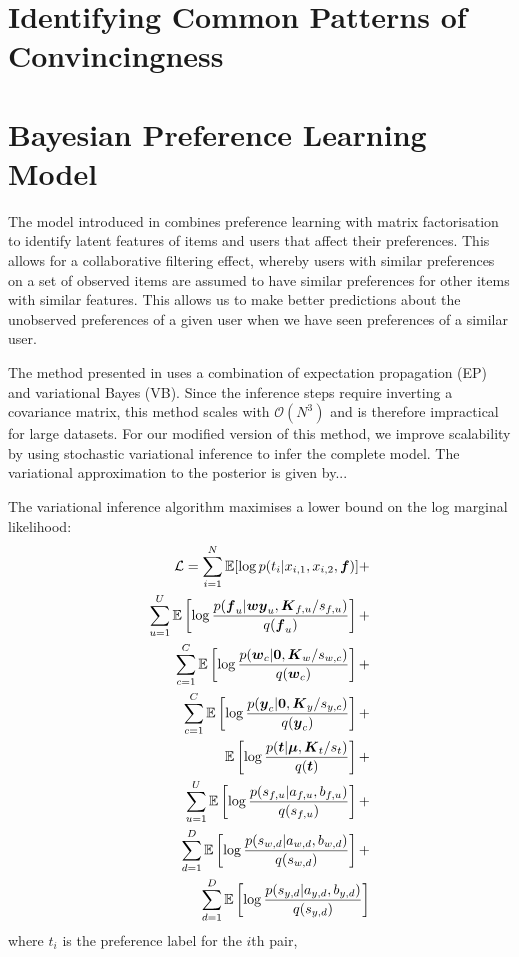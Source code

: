 \section{Identifying Common Patterns of Convincingness}\label{sec:model}

\section{Bayesian Preference Learning Model}

The model introduced in \cite{houlsby2012collaborative} combines preference learning with matrix factorisation 
to identify latent features of items and users that affect their preferences. This allows for a collaborative filtering effect, whereby users with similar preferences on a set of observed items are assumed to have similar 
preferences for other items with similar features. This allows us to make better predictions about the unobserved preferences of a given user when we have seen preferences of a similar user.

The method presented in \cite{houlsby2012collaborative} uses a combination of expectation propagation (EP) and variational Bayes (VB). Since the inference steps require inverting a covariance matrix, this method scales with 
$\mathcal{O}(N^3)$ and is therefore impractical for large datasets. For our modified version of this method, we improve scalability by using stochastic variational inference to infer the complete model. 
The variational approximation to the posterior is given by...

The variational inference algorithm maximises a lower bound on the log marginal likelihood:
\begin{eqnarray}
  \mathcal{L} = \sum_{i=1}^N \mathbb{E}[ \log p(t_i | x_{i,1}, x_{i,2}, \boldsymbol f) ] + \nonumber\\
  \sum_{u=1}^U  \mathbb{E}\left[ \log \frac{p(\boldsymbol f_u | \boldsymbol w \boldsymbol y_u, \boldsymbol K_{f,u} / s_{f,u} )}{q(\boldsymbol f_u)}\right] + \nonumber\\
  \sum_{c=1}^C \mathbb{E}\left[\log\frac{p(\boldsymbol w_c | \boldsymbol 0, \boldsymbol K_w / s_{w,c} ) }{q(\boldsymbol w_c) } \right] + \nonumber\\
  \sum_{c=1}^C \mathbb{E}\left[\log\frac{p(\boldsymbol y_c | \boldsymbol 0, \boldsymbol K_y / s_{y,c} ) }{q(\boldsymbol y_c) } \right] + \nonumber\\
  \mathbb{E}\left[\log\frac{p(\boldsymbol t | \boldsymbol \mu, \boldsymbol K_{t} / s_t ) }{q(\boldsymbol t)} \right] + \nonumber\\
  \sum_{u=1}^U \mathbb{E}\left[\log\frac{p(s_{f,u} | a_{f,u}, b_{f,u})}{q(s_{f,u})}\right] + \nonumber\\
  \sum_{d=1}^D \mathbb{E}\left[\log\frac{p(s_{w,d} | a_{w,d}, b_{w,d})}{q(s_{w,d})}\right] +\nonumber\\
  \sum_{d=1}^D \mathbb{E}\left[\log\frac{p(s_{y,d} | a_{y,d}, b_{y,d})}{q(s_{y,d})}\right] 
\end{eqnarray}
where $t_i$ is the preference label for the $i$th pair, 

